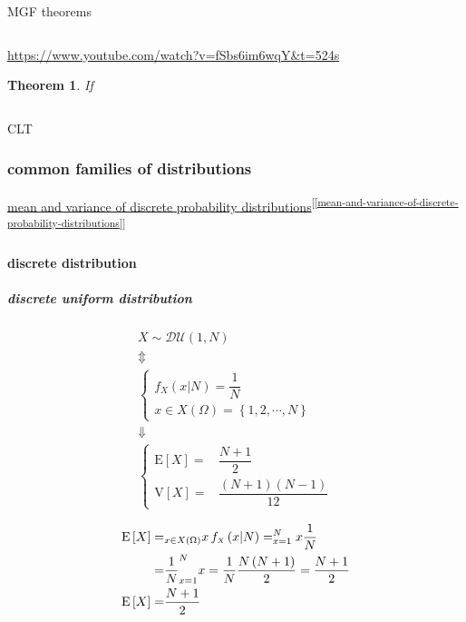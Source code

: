 \documentclass[
]{book}
\newtheorem{theorem}{Theorem}[chapter]
\theoremstyle{definition}
\theoremstyle{definition}
\theoremstyle{definition}
\theoremstyle{definition}
\theoremstyle{remark}
\begin{document}
MGF theorems

\[
\ 
\]

\url{https://www.youtube.com/watch?v=fSbs6im6wqY&t=524s}

\begin{theorem}
\protect\hypertarget{thm:unnamed-chunk-31}{}\label{thm:unnamed-chunk-31}If
\end{theorem}

\[
\ 
\]

CLT

\subsubsection{common families of distributions}\label{common-families-of-distributions}

\hyperref[mean-and-variance-of-discrete-probability-distributions]{mean and variance of discrete probability distributions}\textsuperscript{{[}\ref{mean-and-variance-of-discrete-probability-distributions}{]}}

\paragraph{discrete distribution}\label{discrete-distribution}

\subparagraph{discrete uniform distribution}\label{discrete-uniform-distribution}

\[
\begin{array}{c}
X\sim\mathcal{DU}\left(1,N\right)\\
\Updownarrow\\
\begin{cases}
f_{{\scriptscriptstyle X}}\left(x|N\right)=\dfrac{1}{N}\\
x\in X\left(\Omega\right)=\left\{ 1,2,\cdots,N\right\} 
\end{cases}\\
\Downarrow\\
\begin{cases}
\mathrm{E}\left[X\right]= & \dfrac{N+1}{2}\\
\mathrm{V}\left[X\right]= & \dfrac{\left(N+1\right)\left(N-1\right)}{12}
\end{cases}
\end{array}
\]

\[
\begin{aligned}
\mathrm{E}\left[X\right]= & \sum_{x\in X\left(\Omega\right)}x\thinspace f_{{\scriptscriptstyle X}}\left(x|N\right)=\sum_{x=1}^{N}x\dfrac{1}{N}\\
= & \dfrac{1}{N}\sum_{x=1}^{N}x=\dfrac{1}{N}\dfrac{N\left(N+1\right)}{2}=\dfrac{N+1}{2}\\
\mathrm{E}\left[X\right]= & \dfrac{N+1}{2}
\end{aligned}
\]
\end{document}

